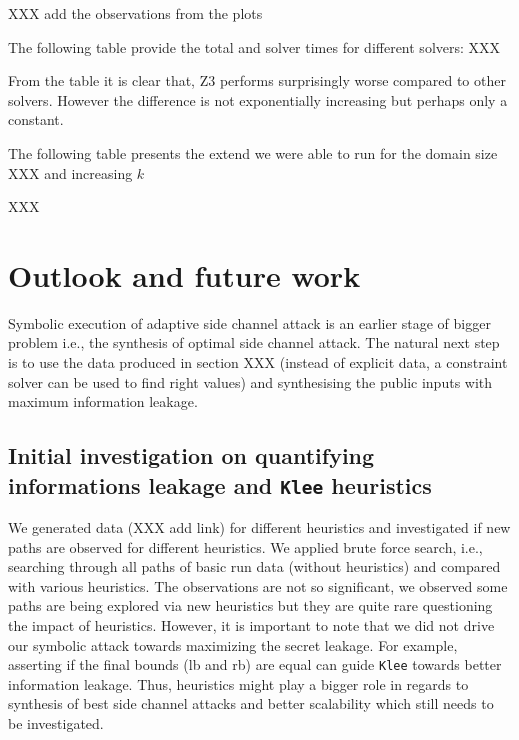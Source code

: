 \documentclass[11pt,a4paper,notitlepage]{article}
\begin{document}
XXX add the observations from the plots

The following table provide the total and solver times for different solvers:
XXX

From the table it is clear that, Z3 performs surprisingly worse compared to other solvers.
However the difference is not exponentially increasing but perhaps only a constant.

The following table presents the extend we were able to run for the domain size XXX and increasing $k$

XXX


\section{Outlook and future work}
\label{sec:futurework}

Symbolic execution of adaptive side channel attack is an earlier stage of bigger problem i.e., the synthesis of optimal side channel attack.
The natural next step is to use the data produced in section XXX (instead of explicit data, a constraint solver can be used to find right values) and synthesising the public inputs with maximum information leakage.

\subsection{Initial investigation on quantifying informations leakage and \texttt{Klee} heuristics}
\label{subsec:initialinvestigationleakage}

We generated data (XXX add link) for different heuristics and investigated if new paths are observed for different heuristics.
We applied brute force search, i.e., searching through all paths of basic run data (without heuristics) and compared with various heuristics.
The observations are not so significant, we observed some paths are being explored via new heuristics but they are quite rare questioning the impact of heuristics.
However, it is important to note that we did not drive our symbolic attack towards maximizing the secret leakage.
For example, asserting if the final bounds (lb and rb) are equal can guide \texttt{Klee} towards better information leakage.
Thus, heuristics might play a bigger role in regards to synthesis of best side channel attacks and better scalability which still needs to be investigated.





\end{document}
